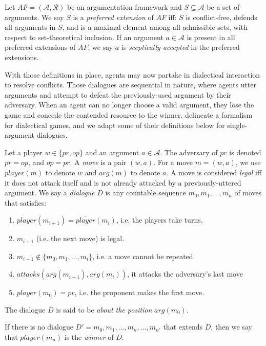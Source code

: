 \documentclass[acmsmall]{custom-arxiv}  %
\begin{document}
\begin{definition} 
Let $AF = (\mathcal{A}, \mathcal{R})$ be an argumentation framework and $S \subseteq \mathcal{A}$ be a set of arguments. We say $S$ is a \textit{preferred extension} of $AF$ iff: $S$ is conflict-free, defends all arguments in $S$, and is a maximal element among all admissible sets, with respect to set-theoretical inclusion. If an argument $a \in \mathcal{A}$ is present in all preferred extensions of $AF$, we say $a$ is \textit{sceptically accepted} in the preferred extensions.
\end{definition}


With those definitions in place, agents may now partake in dialectical interaction to resolve conflicts. Those dialogues are sequential in nature, where agents utter arguments and attempt to defeat the previously-used argument by their adversary. When an agent can no longer choose a valid argument, they lose the game and concede the contended resource to the winner. \citet{Jakobovits1999DialecticFrameworks} delineate a formalism for dialectical games, and we adapt some of their definitions below for single-argument dialogues.

\begin{definition} [Dialogue]
\label{definition:dialogue}
Let a player $w \in \{pr, op\}$ and an argument $a \in \mathcal{A}$. The adversary of $pr$ is denoted $\overline{pr} = op$, and $\overline{op} = pr$. A \textit{move} is a pair $(w, a)$. For a move $m = (w, a)$, we use $\textit{player}(m)$ to denote $w$ and $\textit{arg}(m)$ to denote $a$. A move is considered \textit{legal} iff it does not attack itself and is not already attacked %
by a previously-uttered argument. We say a \textit{dialogue} $D$ is any countable sequence $m_0,m_1,\dots,m_n$ of moves that satisfies:
\begin{enumerate}
    \item $\textit{player}(m_{i+1}) = \overline{\textit{player}}(m_i)$, i.e. the players take turns.
    \item $m_{i+1}$ (i.e. the next move) is legal.
    \item $m_{i+1} \notin \{m_0, m_1, \dots, m_i\}$, i.e. a move cannot be repeated.
    \item $\textit{attacks}(\textit{arg}(m_{i+1}), \textit{arg}(m_i))$, it attacks the adversary's last move
    \item $\textit{player}(m_0) = pr$, i.e. the proponent makes the first move.
\end{enumerate}

The dialogue $D$ is said to be \textit{about the position} $\textit{arg}(m_0)$. 

If there is no dialogue $D' = m_0,m_1,\dots,m_n,\dots,m_{n'}$ that extends $D$, then we say that $\textit{player}(m_n)$ is the \textit{winner} of $D$.
\end{definition}
\end{document}
